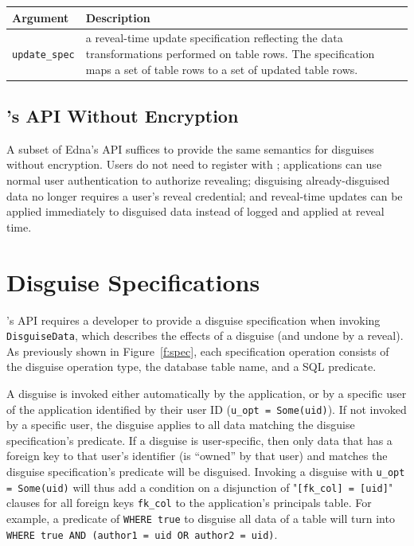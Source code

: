 \begin{center}
    \begin{longtable}{|m{}|m{}|}
        \hline
        \textbf{Argument} & \textbf{Description} \\
        \hline
             \texttt{update\_spec}& a reveal-time update specification reflecting
    the data transformations performed on table rows. The specification maps a
    set of table rows to a set of updated table rows.\\
        \hline
    \end{longtable}
    \end{center}

    
\subsection{\sys's API Without Encryption}
\label{s:noencrypt-api}
A subset of Edna's API suffices to provide the same semantics for disguises
without encryption. Users do not need to register with \sys; applications can
use normal user authentication to authorize revealing; disguising
already-disguised data no longer requires a user's reveal credential; and
reveal-time updates can be applied immediately to disguised data instead of
logged and applied at reveal time.

\section{Disguise Specifications}
\label{s:semantics:spec}

\sys's API requires a developer to provide a disguise specification when
invoking \texttt{DisguiseData}, which describes the effects of a disguise (and
undone by a reveal).  As previously shown in Figure~\ref{f:spec}, each
specification operation consists of the disguise operation type, the database
table name, and a SQL  predicate.
%

%
A disguise is invoked either automatically by the application, or by a specific
user of the application identified by their user ID (\texttt{u\_opt = Some(uid)}).
% 
If not invoked by a specific user, the disguise applies to all data matching the
disguise specification's predicate.
%
If a disguise is user-specific, then only data that has a foreign key to that
user's identifier (is ``owned'' by that user) and matches the disguise
specification's predicate will be disguised. Invoking a disguise with
\texttt{u\_opt = Some(uid)} will thus add a condition on a disjunction of
"\texttt{[fk\_col] = [uid]}" clauses for all foreign keys \texttt{fk\_col} to
the application's principals table. For example, a predicate of \texttt{WHERE
true} to disguise all data of a table will turn into \texttt{WHERE true AND
(author1 = uid OR author2 = uid)}.

